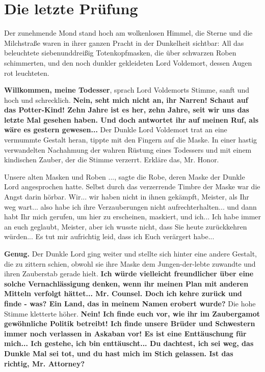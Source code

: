 \chapter{Die letzte Prüfung}

Der zunehmende Mond stand hoch am wolkenlosen Himmel, die Sterne und die
Milchstraße waren in ihrer ganzen Pracht in der Dunkelheit sichtbar: All das
beleuchtete siebenunddreißig Totenkopfmasken, die über schwarzen Roben
schimmerten, und den noch dunkler gekleideten Lord Voldemort, dessen Augen rot
leuchteten.

\glqq{}\textbf{Willkommen, meine Todesser}\grqq{}, sprach Lord Voldemorts Stimme,
sanft und hoch und schrecklich. \glqq{}\textbf{Nein, seht mich nicht an, ihr
Narren! Schaut auf das Potter-Kind! Zehn Jahre ist es her, zehn Jahre, seit wir
uns das letzte Mal gesehen haben. Und doch antwortet ihr auf meinen Ruf, als
wäre es gestern gewesen...}\grqq{} Der Dunkle Lord Voldemort trat an eine vermummte
Gestalt heran, tippte mit den Fingern auf die Maske. \glqq{}In einer hastig
verwandelten Nachahmung der wahren Rüstung eines Todessers und mit einem
kindischen Zauber, der die Stimme verzerrt. Erkläre das, Mr. Honor.\grqq{}

\glqq{}Unsere alten Masken und Roben ...\grqq{}, sagte die Robe, deren Maske der
Dunkle Lord angesprochen hatte. Selbst durch das verzerrende Timbre der Maske
war die Angst darin hörbar. \glqq{}Wir... wir haben nicht in ihnen gekämpft,
Meister, als Ihr weg wart... also habe ich ihre Verzauberungen nicht
aufrechterhalten... und dann habt Ihr mich gerufen, um hier zu erscheinen,
maskiert, und ich... Ich habe immer an euch geglaubt, Meister, aber ich wusste
nicht, dass Sie heute zurückkehren würden... Es tut mir aufrichtig leid, dass
ich Euch verärgert habe...\grqq{}

\glqq{}\textbf{Genug.}\grqq{} Der Dunkle Lord ging weiter und stellte sich hinter eine
andere Gestalt, die zu zittern schien, obwohl sie ihre Maske dem
Jungen-der-lebte zuwandte und ihren Zauberstab gerade hielt. \glqq{}\textbf{Ich
würde vielleicht freundlicher über eine solche Vernachlässigung denken, wenn ihr
meinen Plan mit anderen Mitteln verfolgt hättet... Mr. Counsel. Doch ich kehre
zurück und finde - was? Ein Land, das in meinem Namen erobert wurde?}\grqq{} Die hohe
Stimme kletterte höher. \glqq{}\textbf{Nein! Ich finde euch vor, wie ihr im
Zaubergamot gewöhnliche Politik betreibt! Ich finde unsere Brüder und Schwestern
immer noch verlassen in Askaban vor! Es ist eine Enttäuschung für mich... Ich
gestehe, ich bin enttäuscht... Du dachtest, ich sei weg, das Dunkle Mal sei tot,
und du hast mich im Stich gelassen. Ist das richtig, Mr. Attorney?}\grqq{}

